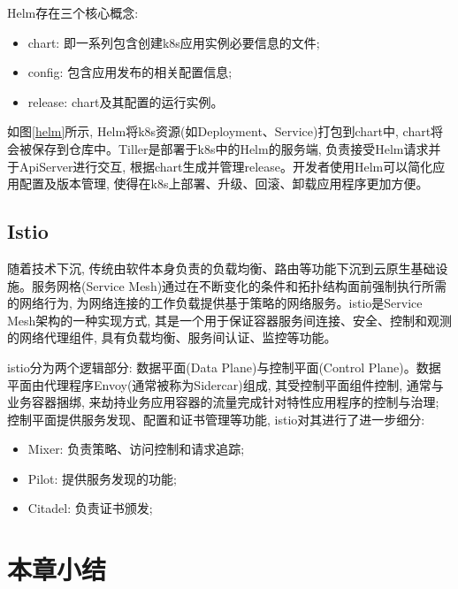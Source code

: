 Helm存在三个核心概念:

\begin{itemize}[itemindent=2em]
    \item chart: 即一系列包含创建k8s应用实例必要信息的文件;

    \item config: 包含应用发布的相关配置信息;

    \item release: chart及其配置的运行实例。
\end{itemize}

如图\ref{helm}所示, Helm将k8s资源(如Deployment、Service)打包到chart中, chart将会被保存到仓库中。Tiller是部署于k8s中的Helm的服务端, 负责接受Helm请求并于ApiServer进行交互, 根据chart生成并管理release。开发者使用Helm可以简化应用配置及版本管理, 使得在k8s上部署、升级、回滚、卸载应用程序更加方便。

\subsection{Istio}

随着技术下沉, 传统由软件本身负责的负载均衡、路由等功能下沉到云原生基础设施。服务网格(Service Mesh)通过在不断变化的条件和拓扑结构面前强制执行所需的网络行为, 为网络连接的工作负载提供基于策略的网络服务\cite{calcote2019istio}。istio\footnotemark[1]是Service Mesh架构的一种实现方式, 其是一个用于保证容器服务间连接、安全、控制和观测的网络代理组件, 具有负载均衡、服务间认证、监控等功能。

istio分为两个逻辑部分\cite{larsson2020impact}: 数据平面(Data Plane)与控制平面(Control Plane)。数据平面由代理程序Envoy(通常被称为Sidercar)组成, 其受控制平面组件控制, 通常与业务容器捆绑, 来劫持业务应用容器的流量完成针对特性应用程序的控制与治理; 控制平面提供服务发现、配置和证书管理等功能, istio对其进行了进一步细分:

\begin{itemize}[itemindent=2em]
    \item Mixer: 负责策略、访问控制和请求追踪;

    \item Pilot: 提供服务发现的功能;

    \item Citadel: 负责证书颁发;
\end{itemize}

\section{本章小结}

